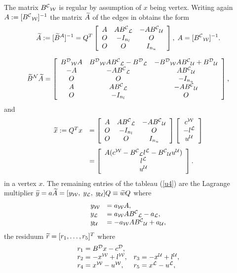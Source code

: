 The matrix $B^{\C}{}_{\W}$ is regular by assumption of $x$ being vertex.
Writing again $A := [B^{\C}{}_{\W}]^{-1}$ the matrix $\wi{A}$ of the
edges in obtains the form
%
\begin{equation} \label{u9}
\wi{A} := [\wi{B}^{\A}]^{-1} = Q^T\ba{[}{ccc}
A & AB^{\C}{}_{\L} & - AB^{\C}{}_{\U} \\
O & - I_{n_l}      & O               \\
O & O              & I_{n_u}
\ea{]},  \; A = [B^{\C}{}_{\W}]^{-1}.
\end{equation}
%

\begin{equation} \label{u10}
\wi{B}^{\N}\wi{A} = \ba{[}{ccc}
B^{\D}{}_{\W}A & B^{\D}{}_{\W}AB^{\C}{}_{\L} - B^{\D}{}_{\L}
& - B^{\D}{}_{\W}AB^{\C}{}_{\U} + B^{\D}{}_{\U} \\
- A & -AB^{\C}{}_{\L} &  AB^{\C}{}_{\U}\\
O   &  O              & - I_{n_u}       \\
A   & AB^{\C}{}_{\L}  &  - AB^{\C}{}_{\U}\\
O   & - I_{n_l}       &  O
\ea{]},
\end{equation}
%
and
\begin{equation} \label{u11}
\ba{.}{ll}
\wi{x} := Q^Tx &=
\ba{[}{ccc}
A & AB^{\C}{}_{\L} & - AB^{\C}{}_{\U} \\
O & - I_{n_l}      & O               \\
O & O              & I_{n_u}
\ea{]}
\ba{[}{c} c^{\W} \\ - l^{\L} \\ u^{\U} \ea{]}\\[7mm]
&=
\ba{[}{c}
A(c^{\W} - B^{\C}{}_{\L}l^{\L} - B^{\C}{}_{\U}u^{\U})\\
l^{\L}\\
u^{\U}
\ea{]}.
\ea{.}
\end{equation}
in a vertex $x$.  The remaining entries of the tableau (\ref{u4}) are the {\sc
Lagrange} multiplier $ \wi{y} = a \wi{A} = [y_{\W}, \; y_{\L}, \; y_{\U} ]Q
\equiv \wi{w}Q$ where
%
\[ \ba{.}{ll}
y_{\W} &=   a_{\W}A,\\
y_{\L} &=   a_{\W}AB^{\C}{}_{\L} - a_{\L}, \\
y_{\U} &= - a_{\W}AB^{\C}{}_{\U} + a_{\U},
\ea{.}
\]
the residuum $\wi{r} = [r_1, \ldots , r_5]^T$ where
%
\[ \ba{.}{ll}
r_1 = B^{\D}x - c^{\D},\\
r_2 = - x^{\W} + l^{\W}, & r_3 = -x^{\U} +l^{\U},\\
r_4 = x^{\W} - u^{\W}, & r_5 = x^{\L} - u^{\L},
\ea{.}
\]
